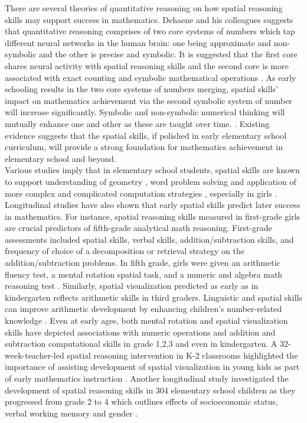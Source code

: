 There are several theories of quantitative reasoning on how spatial reasoning skills may support success in mathematics. Dehaene and his colleagues suggests that quantitative reasoning comprises of two core systems of numbers which tap different neural networks in the human brain: one being approximate and non-symbolic and the other is precise and symbolic. It is suggested that the first core shares neural activity with spatial reasoning skills and the second core is more associated with exact counting and symbolic mathematical operations \parencite{feigenson2004core}. As early schooling results in the two core systems of numbers merging, spatial skills' impact on mathematics achievement via the second symbolic system of number will increase significantly. Symbolic and non-symbolic numerical thinking will mutually enhance one and other as these are taught over time. \parencite{piazza2013education}. Existing evidence suggests that the spatial skills, if polished in early elementary school curriculum, will provide a strong foundation for mathematics achievement in elementary school and beyond. \\
Various studies imply that in elementary school students, spatial skills are known to support understanding of geometry \parencite{clements1997development},  word problem solving and application of more complex and complicated computation strategies\parencite{manger1998effects} , especially in girls \parencite{dearing2012young}. Longitudinal studies have also shown that early spatial skills predict later success in mathematics. For instance, spatial reasoning skills measured in first-grade girls are crucial predictors of fifth-grade analytical math reasoning.  First-grade assessments included spatial skills, verbal skills, addition/subtraction skills, and frequency of choice of a decomposition or retrieval strategy on the addition/subtraction problems. In fifth grade, girls were given an arithmetic fluency test, a mental rotation spatial task, and a numeric and algebra math reasoning test \parencite{casey2017girls}. Similarly, spatial visualization predicted as early as in kindergarten reflects arithmetic skills in third graders. Linguistic and spatial skills can improve arithmetic development by enhancing children's number‐related knowledge \parencite{zhang2014linguistic}. Even at early ages, both mental rotation and spatial visualization skills have depicted associations with numeric operations and  addition and subtraction computational skills in grade 1,2,3 and even in kindergarten. A 32-week-teacher-led spatial reasoning intervention in K-2 classrooms highlighted the importance of assisting development of spatial visualization in young kids as part of early mathematics instruction \parencite{Hawes2017}. Another longitudinal study investigated the development of spatial reasoning skills in 304 elementary school children as they progressed from grade 2 to 4 which outlines effects of socioeconomic status, verbal working memory and gender \parencite{carr2018development}. \\
